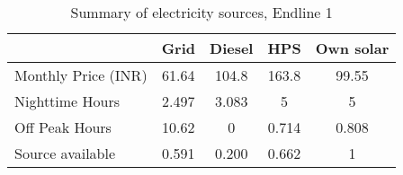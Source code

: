 \begin{table}[htbp]\centering
\caption{Summary of electricity sources, Endline 1}
\begin{tabular}{l*{4}{c}}
\toprule
                &     Grid&   Diesel&      HPS&Own solar\\
\midrule
Monthly Price (INR)&    61.64&    104.8&    163.8&    99.55\\

Nighttime Hours &    2.497&    3.083&        5&        5\\

Off Peak Hours  &    10.62&        0&    0.714&    0.808\\

Source available&    0.591&    0.200&    0.662&        1\\
\bottomrule
\end{tabular}
\end{table}
